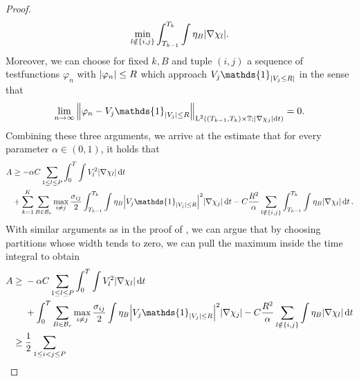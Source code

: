 \begin{proof}
\begin{align*}
				\min_{ l \notin \{ i , j \} }
					\int_{ T_{ k - 1 } }^{ T_{k } }
						\int
							\eta_{ B }
						\abs{ \nabla \chi_{ l } }.
	\end{align*}
	Moreover, we can choose for fixed $k , B $ and tuple $ (i, j ) $ a sequence 
	of testfunctions $ \varphi_{ n } $ with $ \abs{ \varphi_{ n } } \leq R $ 
	which approach $ V_{ j } \mathds{ 1 }_{ \abs{ V_{ j } \leq R } } $
	in the sense that
	\begin{equation*}
		\lim_{ n \to \infty }
		\norm{ \varphi_{ n } - V_{ j } \mathds{ 1 }_{ \abs{ V_{ j } } \leq R } 
		}_{ \lp^{ 2 } \left(
			( T_{ k - 1 }, T_{ k } ) \times \flattorus ;
			\abs{ \nabla \chi_{ j } } \dd{ t }
			\right)
		}
		=
		0.
	\end{equation*}
	Combining these three arguments, we arrive at the estimate that for every 
	parameter $ \alpha \in ( 0 , 1 ) $, it holds that
	\begin{align*}
		A & \geq
		- \alpha C
		\sum_{ 1 \leq l \leq P }
			\int_{ 0 }^{ T }
				\int
					V_{ l }^{ 2 }
				\abs{ \nabla \chi_{ l } }
			\dd{ t }
		\\
		& +
		\sum_{ k = 1 }^{ K }
			\sum_{ B \in \mathcal{ B }_{ r } }
				\max_{ i \neq j }
					\frac{ \sigma_{ i j } }{ 2 }
					\int_{ T_{ k - 1 } }^{ T_{ k } } 
						\int
							\eta_{ B }
							\abs{ V_{ j } \mathds{ 1 }_{ \abs{ V_{ j } } \leq R 
							} }^{ 2 }
						\abs{ \nabla \chi_{ j } }
					\dd{ t }
					- 
					C \frac{ R^{ 2 } }{ \alpha }
					\sum_{ l \notin \{ i , j \} }
						\int_{ T_{ k - 1 } }^{ T_{ k } }
							\int
								\eta_{ B }
							\abs{ \nabla \chi_{ l } }
						\dd{ t }.
	\end{align*}
	With similar arguments as in the proof of 
	, we can argue that by choosing 
	partitions whose width tends to zero, we can pull the maximum inside the 
	time integral to obtain 
	\begin{align*}
		A\geq{}  & 
		- \alpha C
		\sum_{ 1 \leq l \leq P }
		\int_{ 0 }^{ T }
		\int
		V_{ l }^{ 2 }
		\abs{ \nabla \chi_{ l } }
		\dd{ t }
		\\
		& +
		\int_{ 0 }^{ T }
		\sum_{ B \in \mathcal{ B }_{ r } }
		\max_{ i \neq j }
		\frac{ \sigma_{ i j } }{ 2 }
		\int
		\eta_{ B }
		\abs{ V_{ j } \mathds{ 1 }_{ \abs{ V_{ j } } \leq R 
		} }^{ 2 }
		\abs{ \nabla \chi_{ j } }
		- 
		C \frac{ R^{ 2 } }{ \alpha }
		\sum_{ l \notin \{ i , j \} }
		\int
		\eta_{ B }
		\abs{ \nabla \chi_{ l } }
		\dd{ t }
		\\
		\geq{} &
		\frac{ 1 }{ 2 }
		\sum_{ 1 \leq i < j \leq P }

\end{align*}
\end{proof}
